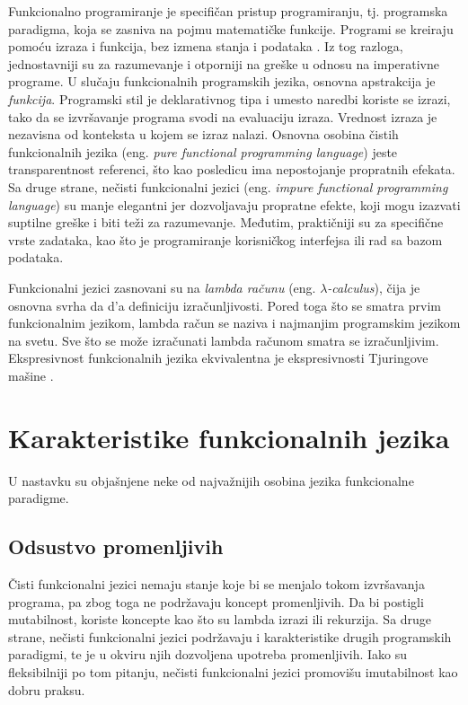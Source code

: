 \documentclass[12pt,oneside]{memoir}
\begin{document}
\par Funkcionalno programiranje je specifičan pristup programiranju, tj. programska paradigma, koja se zasniva na pojmu matematičke funkcije. Programi se kreiraju pomoću izraza i funkcija, bez izmena stanja i podataka \cite{func}. Iz tog razloga, jednostavniji su za razumevanje i otporniji na greške u odnosu na imperativne programe. U slučaju funkcionalnih programskih jezika, osnovna apstrakcija je \textit{funkcija}. Programski stil je deklarativnog tipa i umesto naredbi koriste se izrazi, tako da se izvršavanje programa svodi na evaluaciju izraza. Vrednost izraza je nezavisna od konteksta u kojem se izraz nalazi. Osnovna osobina čistih funkcionalnih jezika (eng. \textit{pure functional programming language}) jeste transparentnost referenci, što kao posledicu ima nepostojanje propratnih efekata. Sa druge strane, nečisti funkcionalni jezici (eng. \textit{impure functional programming language}) su manje elegantni jer dozvoljavaju propratne efekte, koji mogu izazvati suptilne greške i biti teži za razumevanje. Međutim, praktičniji su za specifične vrste zadataka, kao što je programiranje korisničkog interfejsa ili rad sa bazom podataka. 
\par Funkcionalni jezici zasnovani su na \textit{lambda računu} (eng. \textit{$\lambda$-calculus}), čija je osnovna svrha da d\a'a  definiciju izračunljivosti. Pored toga što se smatra prvim funkcionalnim jezikom, lambda račun se naziva i najmanjim programskim jezikom na svetu. Sve što se može izračunati lambda računom smatra se izračunljivim. Ekspresivnost funkcionalnih jezika ekvivalentna je ekspresivnosti Tjuringove mašine \cite{turing}. 

\section{Karakteristike funkcionalnih jezika}
U nastavku su objašnjene neke od najvažnijih osobina jezika funkcionalne paradigme. 

\subsection{Odsustvo promenljivih}
Čisti funkcionalni jezici nemaju stanje koje bi se menjalo tokom izvršavanja programa, pa zbog toga ne podržavaju koncept promenljivih. Da bi postigli mutabilnost, koriste koncepte kao što su lambda izrazi ili rekurzija.  Sa druge strane, nečisti funkcionalni jezici podržavaju i karakteristike drugih programskih paradigmi, te je u okviru njih dozvoljena upotreba promenljivih. Iako su fleksibilniji po tom pitanju, nečisti funkcionalni jezici promovišu imutabilnost kao dobru praksu. 
\end{document}
